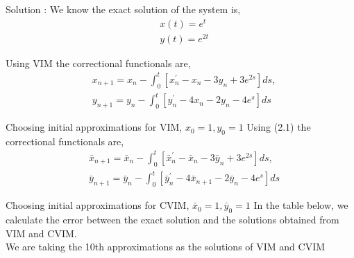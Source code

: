 \documentclass[12pt, a4paper]{report}
\begin{document}
Solution :
We know the exact solution of the system is,
$$
\begin{aligned}
& x(t)=e^t \\
& y(t)=e^{2 t}
\end{aligned}
$$

Using VIM the correctional functionals are,
$$
\begin{aligned}
& x_{n+1}=x_n-\int_0^t\left[x_n^{\prime}-x_n-3 y_n+3 e^{2 s}\right] d s, \\
& y_{n+1}=y_n-\int_0^t\left[y_n^{\prime}-4 x_n-2 y_n-4 e^s\right] d s
\end{aligned}
$$

Choosing initial approximations for VIM, $x_0=1, y_0=1$
Using (2.1) the correctional functionals are,
$$
\begin{aligned}
& \bar{x}_{n+1}=\bar{x}_n-\int_0^t\left[\bar{x}_n^{\prime}-\bar{x}_n-3 \bar{y}_n+3 e^{2 s}\right] d s, \\
& \bar{y}_{n+1}=\bar{y}_n-\int_0^t\left[\bar{y}_n^{\prime}-4 \bar{x}_{n+1}-2 \bar{y}_n-4 e^s\right] d s
\end{aligned}
$$

Choosing initial approximations for CVIM, $\bar{x}_0=1, \bar{y}_0=1$
\clearpage
In the table below, we calculate the error between the exact solution and the solutions obtained from VIM and CVIM.\\
We are taking the 10th approximations as the solutions of VIM and CVIM
\end{document}
